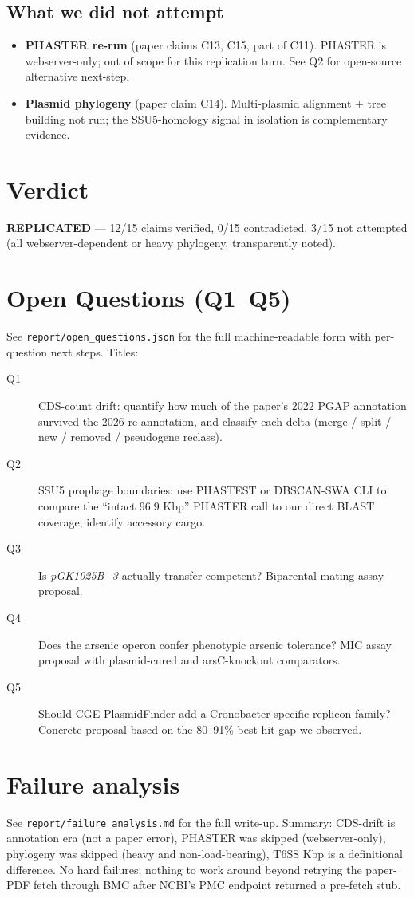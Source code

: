 \documentclass[11pt]{article}
\begin{document}
\subsection{What we did not attempt}
\begin{itemize}
\item \textbf{PHASTER re-run} (paper claims C13, C15, part of C11). PHASTER is webserver-only;
      out of scope for this replication turn. See Q2 for open-source alternative next-step.
\item \textbf{Plasmid phylogeny} (paper claim C14). Multi-plasmid alignment + tree building not
      run; the SSU5-homology signal in isolation is complementary evidence.
\end{itemize}

\section{Verdict}
\textbf{REPLICATED} --- 12/15 claims verified, 0/15 contradicted, 3/15 not attempted (all
webserver-dependent or heavy phylogeny, transparently noted).

\section{Open Questions (Q1--Q5)}\label{sec:openq}
See \texttt{report/open\_questions.json} for the full machine-readable form with per-question
next steps. Titles:
\begin{description}
\item[Q1] CDS-count drift: quantify how much of the paper's 2022 PGAP annotation survived the
  2026 re-annotation, and classify each delta (merge / split / new / removed / pseudogene reclass).
\item[Q2] SSU5 prophage boundaries: use PHASTEST or DBSCAN-SWA CLI to compare the ``intact 96.9
  Kbp'' PHASTER call to our direct BLAST coverage; identify accessory cargo.
\item[Q3] Is \emph{pGK1025B\_3} actually transfer-competent? Biparental mating assay proposal.
\item[Q4] Does the arsenic operon confer phenotypic arsenic tolerance? MIC assay proposal with
  plasmid-cured and arsC-knockout comparators.
\item[Q5] Should CGE PlasmidFinder add a Cronobacter-specific replicon family? Concrete proposal
  based on the 80--91\% best-hit gap we observed.
\end{description}

\section{Failure analysis}\label{sec:failure}
See \texttt{report/failure\_analysis.md} for the full write-up. Summary: CDS-drift is annotation
era (not a paper error), PHASTER was skipped (webserver-only), phylogeny was skipped (heavy and
non-load-bearing), T6SS Kbp is a definitional difference. No hard failures; nothing to work around
beyond retrying the paper-PDF fetch through BMC after NCBI's PMC endpoint returned a pre-fetch
stub.
\end{document}
